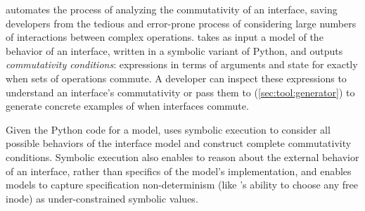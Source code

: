 \analyzer automates the process of analyzing the commutativity of an
interface, saving developers from the tedious and error-prone process of
considering large numbers of interactions between complex operations.
%
\analyzer takes as input a model of the behavior of an interface,
written in a symbolic variant of Python, and outputs \emph{commutativity
  conditions}: expressions in terms of arguments and state for exactly
when sets of operations commute.
%
A developer can inspect these expressions to understand an interface's
commutativity or pass them to \testgen (\cref{sec:tool:generator})
to generate concrete examples of when interfaces commute.

%
%
%

Given the Python code for a model, \analyzer uses symbolic execution to
consider all possible behaviors of the interface model and construct
complete commutativity conditions.  Symbolic execution also enables
\analyzer to reason about the external behavior of an interface, rather
than specifics of the model's implementation, and enables models to
capture specification non-determinism (like 's ability to
choose any free inode) as under-constrained symbolic values.



